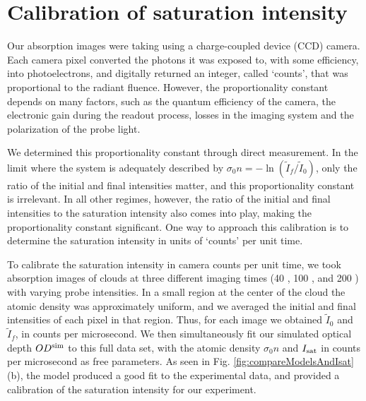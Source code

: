 \section{Calibration of saturation intensity}
Our absorption images were taking using a charge-coupled device (CCD) camera.  Each camera pixel  converted the photons it was exposed to, with some efficiency, into photoelectrons, and digitally returned an integer, called `counts', that was proportional to the radiant fluence.  However, the proportionality constant depends on many factors, such as the quantum efficiency of the camera, the electronic gain during the readout process, losses in the imaging system and the polarization of the probe light.
\par We determined this proportionality constant through direct measurement. In the limit where the system is adequately described by $\sigma_0 n=-\ln(\tilde{I}_f/\tilde{I}_0)$, only the ratio of the initial and final intensities matter, and this proportionality constant is irrelevant. In all other regimes, however, the ratio of the initial and final intensities to the saturation intensity also comes into play, making the proportionality constant significant. One way to approach this calibration is to determine the saturation intensity in units of `counts' per unit time.
\par To calibrate the saturation intensity in camera counts per unit time, we took absorption images of \K{} clouds at three different imaging times (40 \us{}, 100 \us{}, and 200 \us{}) with varying probe intensities. In a small region at the center of the cloud the atomic density was approximately uniform, and we averaged the initial and final intensities of each pixel in that region. Thus, for each image we obtained $\tilde{I}_0$ and $\tilde{I}_f$, in counts per microsecond. We then simultaneously fit our simulated optical depth  $OD^{\rm{sim}}$ to this full data set, with the atomic density $\sigma_0 n$ and  $I_{\rm{sat}}$ in counts per microsecond as free parameters. As seen in Fig. \ref{fig:compareModelsAndIsat}(b), the model produced a good fit to the experimental data, and provided a calibration of the saturation intensity for our experiment.
